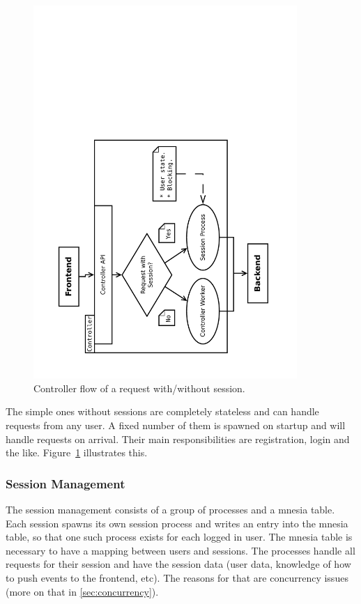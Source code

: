 \documentclass[11pt,a4paper]{report}
\begin{document}
\begin{figure}[h]
 \centering
 \includegraphics[width=10cm, angle=-90]{./graphics/Concurrency_-_session_proc.pdf}
 \vspace{-1cm}
 \caption{Controller flow of a request with/without session.}
 \label{fig:controller:session_proc}
\end{figure}

The simple ones without sessions are completely stateless and can handle requests from any user.
A fixed number of them is spawned on startup and will handle requests on
arrival.
Their main responsibilities are registration, login and the like.
Figure~\ref{fig:controller:session_proc} illustrates this.

\subsubsection{Session Management}
The session management consists of a group of processes and a mnesia table.
Each session spawns its own session process and writes an entry into the mnesia
table, so that one such process exists for each logged in user.
The mnesia table is necessary to have a mapping between users and sessions.
The processes handle all requests for their session and have the session data
(user data, knowledge of how to push events to the frontend, etc).
The reasons for that are concurrency issues
(more on that in \ref{sec:concurrency}).
\end{document}

